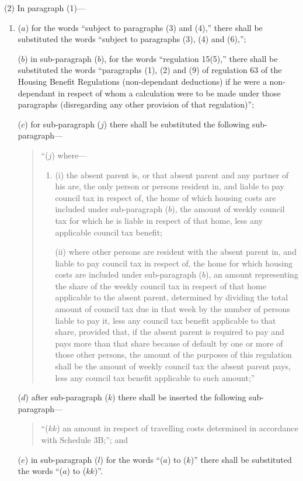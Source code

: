 \documentclass[a4paper]{article}
\begin{document}
(2) In paragraph (1)—
\begin{enumerate}\item[]
($a$) for the words “subject to paragraphs (3) and (4),” there shall be substituted the words “subject to paragraphs (3), (4) and (6),”;

($b$) in sub-paragraph ($b$), for the words “regulation 15(5),” there shall be substituted the words “paragraphs (1), (2) and (9) of regulation 63 of the Housing Benefit Regulations (non-dependant deductions) if he were a non-dependant in respect of whom a calculation were to be made under those paragraphs (disregarding any other provision of that regulation)”;

($c$) for sub-paragraph ($j$) there shall be substituted the following sub-paragraph—
\begin{quotation}
“($j$) where—
\begin{enumerate}\item[]
(i) the absent parent is, or that absent parent and any partner of his are, the only person or persons resident in, and liable to pay council tax in respect of, the home of which housing costs are included under sub-paragraph ($b$), the amount of weekly council tax for which he is liable in respect of that home, less any applicable council tax benefit;

(ii) where other persons are resident with the absent parent in, and liable to pay council tax in respect of, the home for which housing costs are included under sub-paragraph ($b$), an amount representing the share of the weekly council tax in respect of that home applicable to the absent parent, determined by dividing the total amount of council tax due in that week by the number of persons liable to pay it, less any council tax benefit applicable to that share, provided that, if the absent parent is required to pay and pays more than that share because of default by one or more of those other persons, the amount of the purposes of this regulation shall be the amount of weekly council tax the absent parent pays, less any council tax benefit applicable to such amount;”
\end{enumerate}
\end{quotation}

($d$) after sub-paragraph ($k$) there shall be inserted the following sub-paragraph—
\begin{quotation}
“($kk$) an amount in respect of travelling costs determined in accordance with Schedule 3B;”; and
\end{quotation}

($e$) in sub-paragraph ($l$) for the words “($a$) to ($k$)” there shall be substituted the words “($a$) to ($kk$)”.
\end{enumerate}
\end{document}

